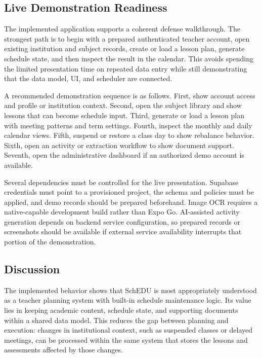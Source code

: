 \documentclass[conference]{IEEEtran}
\begin{document}
\subsection{Live Demonstration Readiness}

The implemented application supports a coherent defense walkthrough. The strongest
path is to begin with a prepared authenticated teacher account, open existing
institution and subject records, create or load a lesson plan, generate schedule
state, and then inspect the result in the calendar. This avoids spending the
limited presentation time on repeated data entry while still demonstrating that
the data model, UI, and scheduler are connected.

A recommended demonstration sequence is as follows. First, show account access and
profile or institution context. Second, open the subject library and show lessons
that can become schedule input. Third, generate or load a lesson plan with meeting
patterns and term settings. Fourth, inspect the monthly and daily calendar views.
Fifth, suspend or restore a class day to show rebalance behavior. Sixth, open an
activity or extraction workflow to show document support. Seventh, open the
administrative dashboard if an authorized demo account is available.

Several dependencies must be controlled for the live presentation. Supabase
credentials must point to a provisioned project, the schema and policies must be
applied, and demo records should be prepared beforehand. Image OCR requires a
native-capable development build rather than Expo Go. AI-assisted activity
generation depends on backend service configuration, so prepared records or
screenshots should be available if external service availability interrupts that
portion of the demonstration.

\subsection{Discussion}

The implemented behavior shows that SchEDU is most appropriately understood as a
teacher planning system with built-in schedule maintenance logic. Its value lies in
keeping academic content, schedule state, and supporting documents within a shared
data model. This reduces the gap between planning and execution: changes in
institutional context, such as suspended classes or delayed meetings, can be
processed within the same system that stores the lessons and assessments affected by
those changes.
\end{document}
